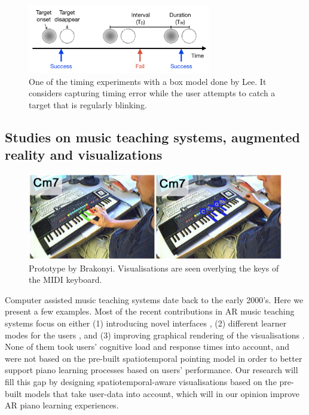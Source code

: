 \documentclass[manuscript,screen]{acmart}
\begin{document}
\begin{figure}[t]
\centering
 \includegraphics[width=8cm]{figures/boxmodel.png}
    \caption{One of the timing experiments with a box model done by Lee. It considers capturing timing error while the user attempts to catch a target that is regularly blinking.
    }\label{fig:boxmodel}
\end{figure}

\subsection{Studies on music teaching systems, augmented reality and visualizations}

\begin{figure}[h]
\centering
 \includegraphics[width=12cm]{figures/barakonyi.png}
    \caption{Prototype by Brakonyi. Visualisations are seen overlying the keys of the MIDI keyboard.
    }\label{fig:barakonyi}
\end{figure}

Computer assisted music teaching systems date back to the early 2000’s. Here we present a few examples. Most of the recent contributions in AR music teaching systems focus on either (1) introducing novel interfaces \cite{barakonyi2005augmented, huang2011piano}, (2) different learner modes for the users \cite{weing2013piano, rogers2014piano}, and (3) improving graphical rendering of the visualisations \cite{chow2013music, zheng2013general}. None of them took users’ cognitive load and response times into account, and were not based on the pre-built spatiotemporal pointing model in order to better support piano learning processes based on users’ performance. Our research will fill this gap by designing spatiotemporal-aware visualisations based on the pre-built models that take user-data into account, which will in our opinion improve AR piano learning experiences.\\
\end{document}
